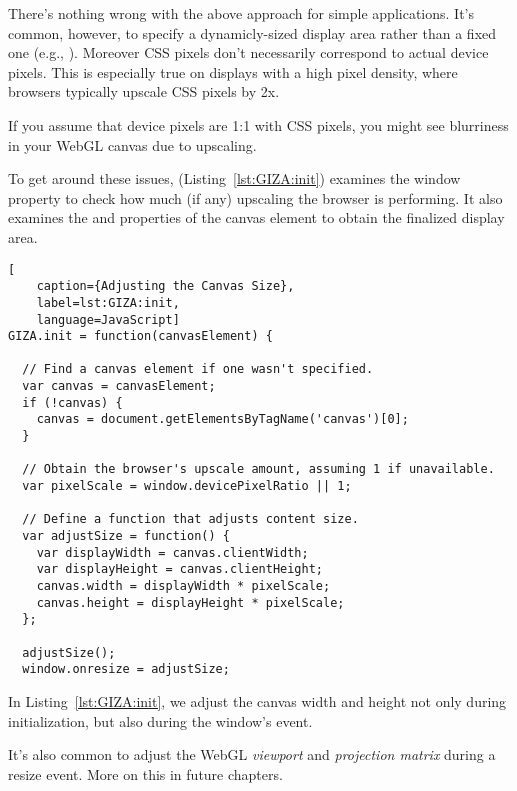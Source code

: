 There's nothing wrong with the above approach for simple applications.  It's common, however, to specify a dynamicly-sized display area rather than a fixed one (e.g., ).  Moreover CSS pixels don't necessarily correspond to actual device pixels.  This is especially true on displays with a high pixel density, where browsers typically upscale CSS pixels by 2x.

\begin{sidenote}
If you assume that device pixels are 1:1 with CSS pixels, you might see blurriness in your WebGL canvas due to upscaling.
\end{sidenote}

To get around these issues,   (Listing~\ref{lst:GIZA:init}) examines the  window property to check how much (if any) upscaling the browser is performing.  It also examines the   and  properties of the canvas element to obtain the finalized display area.

\begin{lstlisting}[
    caption={Adjusting the Canvas Size},
    label=lst:GIZA:init,
    language=JavaScript]
GIZA.init = function(canvasElement) {

  // Find a canvas element if one wasn't specified.
  var canvas = canvasElement;
  if (!canvas) {
    canvas = document.getElementsByTagName('canvas')[0];
  }

  // Obtain the browser's upscale amount, assuming 1 if unavailable.
  var pixelScale = window.devicePixelRatio || 1;

  // Define a function that adjusts content size.
  var adjustSize = function() {
    var displayWidth = canvas.clientWidth;
    var displayHeight = canvas.clientHeight;
    canvas.width = displayWidth * pixelScale;
    canvas.height = displayHeight * pixelScale;
  };

  adjustSize();
  window.onresize = adjustSize;
\end{lstlisting}

In Listing~\ref{lst:GIZA:init}, we adjust the canvas width and height not only during initialization, but also during the window's   event.

\begin{sidenote}
It's also common to adjust the WebGL \emph{viewport} and \emph{projection matrix} during a resize event.  More on this in future chapters.
\end{sidenote}

